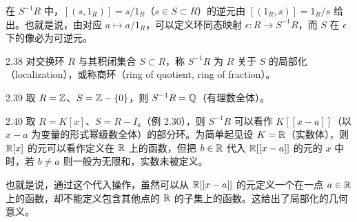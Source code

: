 在 $S^{-1}R$ 中，$[(s,1_R)]=s/1_R$（$s\in S\subset R$）的逆元由 $[(1_R,s)]=1_R/s$ 给出。也就是说，由对应 $a\mapsto a/1_R$，可以定义环同态映射 $\epsilon\colon R\to S^{-1}R$，而 $S$ 在 $\epsilon$ 下的像必为可逆元。

\begin{definition}{2.38} 对交换环 $R$ 与其积闭集合 $S\subset R$，称 $S^{-1}R$ 为 $R$ 关于 $S$ 的局部化（localization），或称商环（ring of quotient, ring of fraction）。\end{definition}

\begin{example}{2.39} 取 $R=\mathbb{Z}$、$S=\mathbb{Z}-\{0\}$，则 $S^{-1}R=\mathbb{Q}$（有理数全体）。\end{example}

\begin{example}{2.40} 取 $R=K[x]$、$S=R-I_a$（例 2.30），则 $S^{-1}R$ 可以看作 $K[[x-a]]$（以 $x-a$ 为变量的形式幂级数全体）的部分环。为简单起见设 $K=\mathbb{R}$（实数体），则 $\mathbb{R}[x]$ 的元可以看作定义在 $\mathbb{R}$ 上的函数，但把 $b\in\mathbb{R}$ 代入 $\mathbb{R}[[x-a]]$ 的元的 $x$ 中时，若 $b\neq a$ 则一般为无限和，实数未被定义。



也就是说，通过这个代入操作，虽然可以从 $\mathbb{R}[[x-a]]$ 的元定义一个在一点 $a\in\mathbb{R}$ 上的函数，却不能定义包含其他点的 $\mathbb{R}$ 的子集上的函数。这给出了局部化的几何意义。\end{example}


